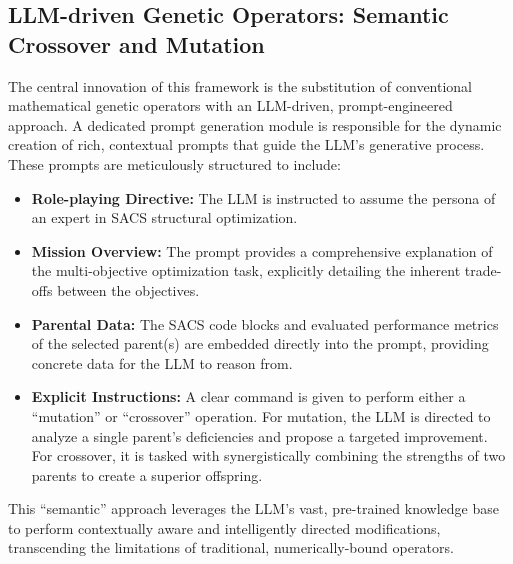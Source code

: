 \documentclass[preprint,12pt]{elsarticle}
\begin{document}
\subsection{LLM-driven Genetic Operators: Semantic Crossover and Mutation}
The central innovation of this framework is the substitution of conventional mathematical genetic operators with an LLM-driven, prompt-engineered approach. A dedicated prompt generation module is responsible for the dynamic creation of rich, contextual prompts that guide the LLM's generative process. These prompts are meticulously structured to include:
\begin{itemize}
    \item \textbf{Role-playing Directive:} The LLM is instructed to assume the persona of an expert in SACS structural optimization.
    \item \textbf{Mission Overview:} The prompt provides a comprehensive explanation of the multi-objective optimization task, explicitly detailing the inherent trade-offs between the objectives.
    \item \textbf{Parental Data:} The SACS code blocks and evaluated performance metrics of the selected parent(s) are embedded directly into the prompt, providing concrete data for the LLM to reason from.
    \item \textbf{Explicit Instructions:} A clear command is given to perform either a ``mutation'' or ``crossover'' operation. For mutation, the LLM is directed to analyze a single parent's deficiencies and propose a targeted improvement. For crossover, it is tasked with synergistically combining the strengths of two parents to create a superior offspring.
\end{itemize}

This ``semantic'' approach leverages the LLM's vast, pre-trained knowledge base to perform contextually aware and intelligently directed modifications, transcending the limitations of traditional, numerically-bound operators.
\end{document}
